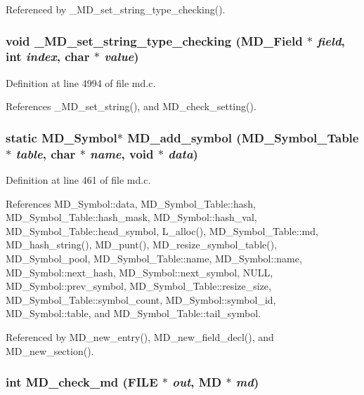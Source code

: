 Referenced by \_\-MD\_\-set\_\-string\_\-type\_\-checking().
\subsubsection{\setlength{\rightskip}{0pt plus 5cm}void \_\-MD\_\-set\_\-string\_\-type\_\-checking (\bf{MD\_\-Field} $\ast$ {\em field}, int {\em index}, char $\ast$ {\em value})}\label{md_8c_13db3b075bd2cebd2d5bac2f3ad51216}




Definition at line 4994 of file md.c.

References \_\-MD\_\-set\_\-string(), and MD\_\-check\_\-setting().
\subsubsection{\setlength{\rightskip}{0pt plus 5cm}static \bf{MD\_\-Symbol}$\ast$ MD\_\-add\_\-symbol (\bf{MD\_\-Symbol\_\-Table} $\ast$ {\em table}, char $\ast$ {\em name}, void $\ast$ {\em data})\hspace{0.3cm}{\tt  [static]}}\label{md_8c_3d5299eda9958c5f736d53c76826bed7}




Definition at line 461 of file md.c.

References MD\_\-Symbol::data, MD\_\-Symbol\_\-Table::hash, MD\_\-Symbol\_\-Table::hash\_\-mask, MD\_\-Symbol::hash\_\-val, MD\_\-Symbol\_\-Table::head\_\-symbol, L\_\-alloc(), MD\_\-Symbol\_\-Table::md, MD\_\-hash\_\-string(), MD\_\-punt(), MD\_\-resize\_\-symbol\_\-table(), MD\_\-Symbol\_\-pool, MD\_\-Symbol\_\-Table::name, MD\_\-Symbol::name, MD\_\-Symbol::next\_\-hash, MD\_\-Symbol::next\_\-symbol, NULL, MD\_\-Symbol::prev\_\-symbol, MD\_\-Symbol\_\-Table::resize\_\-size, MD\_\-Symbol\_\-Table::symbol\_\-count, MD\_\-Symbol::symbol\_\-id, MD\_\-Symbol::table, and MD\_\-Symbol\_\-Table::tail\_\-symbol.

Referenced by MD\_\-new\_\-entry(), MD\_\-new\_\-field\_\-decl(), and MD\_\-new\_\-section().
\subsubsection{\setlength{\rightskip}{0pt plus 5cm}int MD\_\-check\_\-md (FILE $\ast$ {\em out}, \bf{MD} $\ast$ {\em md})}\label{md_8c_c8488b1c9a90e9b52187a89338183b2c}




